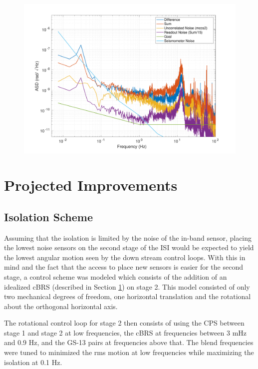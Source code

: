 \documentclass [12pt, proquest]{uwthesis}[2019]
\begin{document}
\begin{figure}%
\begin{center}
 \includegraphics[width=\textwidth]{cBRS_Noise_11_19_19.pdf}
\caption{}
\label{cBRS_noise}
\end{center}
\end{figure}
\section{Projected Improvements}
\subsection{Isolation Scheme} \label{IsoScheme}

Assuming that the isolation is limited by the noise of the in-band sensor, placing the lowest noise sensors on the second stage of the ISI would be expected to yield the lowest angular motion seen by the down stream control loops. With this in mind and the fact that the access to place new sensors is easier for the second stage, a control scheme was modeled which consists of the addition of an idealized cBRS (described in Section \ref{}) on stage 2. This model consisted of only two mechanical degrees of freedom, one horizontal translation and the rotational about the orthogonal horizontal axis.

The rotational control loop for stage 2 then consists of using the CPS between stage 1 and stage 2 at low frequencies, the cBRS at frequencies between 3 mHz and 0.9 Hz, and the GS-13 pairs at frequencies above that. The blend frequencies were tuned to minimized the rms motion at low frequencies while maximizing the isolation at 0.1 Hz. 
\end{document}
